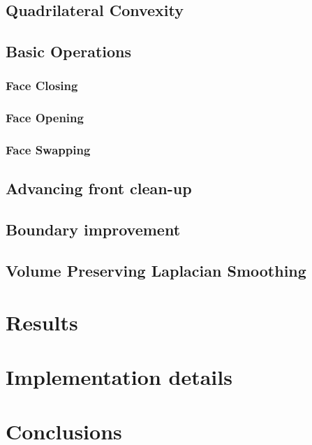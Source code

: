 \documentclass[11pt, a4paper]{paper}
\begin{document}
\subsection{ Quadrilateral Convexity }
\subsection{ Basic Operations}
\subsubsection{ Face Closing }
\subsubsection{ Face Opening }
\subsubsection{ Face Swapping }
\subsection { Advancing front clean-up}
\subsection { Boundary improvement}
\subsection { Volume Preserving Laplacian Smoothing}
\section {Results}
\section { Implementation details }

\section {Conclusions}
\end{document}
